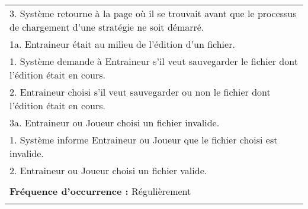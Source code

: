 \begin{tabular}{|p{16cm}|}
	\hspace{1cm}3. Système retourne à la page où il se trouvait avant que le processus de chargement d'une stratégie ne soit démarré.\\
	1a. Entraineur était au milieu de l'édition d'un fichier.\\
	\hspace{1cm}1. Système demande à Entraineur s'il veut sauvegarder le fichier dont l'édition était en cours.\\
	\hspace{1cm}2. Entraineur choisi s'il veut sauvegarder ou non le fichier dont l'édition était en cours.\\
	3a. Entraineur ou Joueur choisi un fichier invalide.\\
	\hspace{1cm}1. Système informe Entraineur ou Joueur que le fichier choisi est invalide.\\
	\hspace{1cm}2. Entraineur ou Joueur choisi un fichier valide.\\
	\\
	\textbf{Fréquence d'occurrence :} Régulièrement\\
	\\
	\hline
\end{tabular}